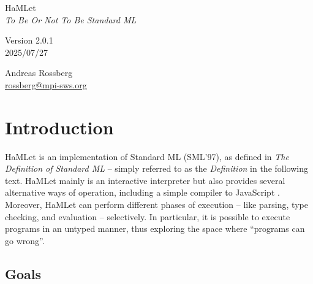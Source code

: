 \documentclass[twoside,titlepage]{article}
\begin{document}

\begin{titlepage}
\begin{center}

\vspace*{5cm}
{\Huge HaMLet} \\
\vspace{5mm}
{\large\it To Be Or Not To Be Standard ML} \\
\vspace{1cm}

\vspace{1cm}
Version 2.0.1 \\
2025/07/27

\vspace{3cm}
\large
Andreas Rossberg \\
\url{rossberg@mpi-sws.org}

\end{center}
\end{titlepage}


{
\setlength{\parskip}{0.5ex}
\tableofcontents
}

\vfill
\pagebreak


\section{Introduction}
\label{intro}

HaMLet is an implementation of Standard ML (SML'97), as defined in {\it The Definition of Standard ML} \cite{definition} -- simply referred to as the {\em Definition} in the following text. HaMLet mainly is an interactive interpreter but also provides several alternative ways of operation, including a simple compiler to JavaScript \cite{ecmascript}. Moreover, HaMLet can perform different phases of execution -- like parsing, type checking, and evaluation -- selectively. In particular, it is possible to execute programs in an untyped manner, thus exploring the space where ``programs can go wrong''.


\subsection{Goals}
\label{goals}
\end{document}
